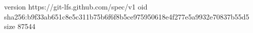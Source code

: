 version https://git-lfs.github.com/spec/v1
oid sha256:b9f33ab651c8e5c311b75b6f6f8b5ce975950618e4f277e5a9932e70837b55d5
size 87544
